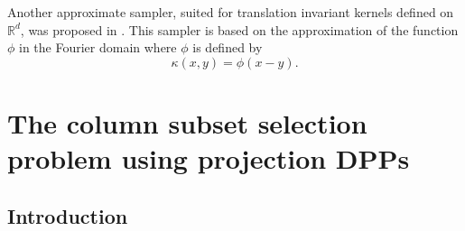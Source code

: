 \documentclass[twoside,11pt]{book}
\numberwithin{theorem}{chapter}
\numberwithin{definition}{chapter}
\numberwithin{proposition}{chapter}
\numberwithin{corollary}{chapter}
\numberwithin{example}{chapter}
\numberwithin{lemma}{chapter}
\numberwithin{assumption}{chapter}
\numberwithin{equation}{chapter}
\numberwithin{figure}{chapter}
\begin{document}
 Another approximate sampler, suited for translation invariant kernels defined on $\mathbb{R}^{d}$, was proposed in \citep{LaMoRu15}. This sampler is based on the approximation of the function $\phi$ in the Fourier domain where $\phi$ is defined by
 \begin{equation}
 \kappa(x,y) = \phi(x-y).
 \end{equation}










\chapter{The column subset selection problem using projection DPPs}\label{chapter:cssp}
\section{Introduction}


\end{document}
